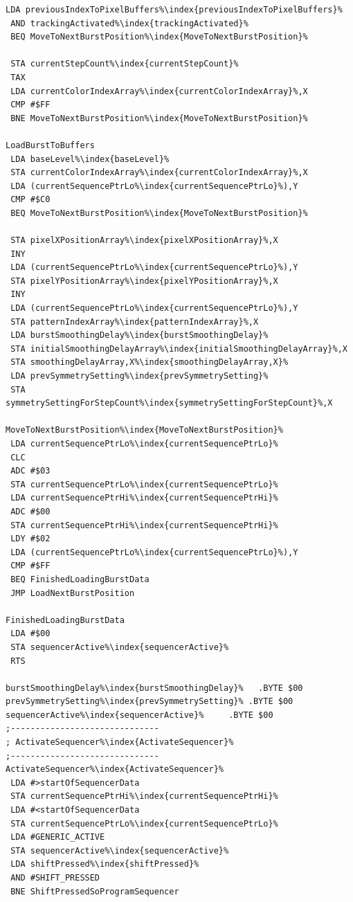 \begin{minipage}[b]{0.33\linewidth}
\begin{lrbox}{\mybox}%
\begin{lstlisting}[basicstyle=\ttfamily\tiny,escapechar=\%]
 LDA previousIndexToPixelBuffers%\index{previousIndexToPixelBuffers}%
 AND trackingActivated%\index{trackingActivated}%
 BEQ MoveToNextBurstPosition%\index{MoveToNextBurstPosition}%

 STA currentStepCount%\index{currentStepCount}%
 TAX
 LDA currentColorIndexArray%\index{currentColorIndexArray}%,X
 CMP #$FF
 BNE MoveToNextBurstPosition%\index{MoveToNextBurstPosition}%

LoadBurstToBuffers
 LDA baseLevel%\index{baseLevel}%
 STA currentColorIndexArray%\index{currentColorIndexArray}%,X
 LDA (currentSequencePtrLo%\index{currentSequencePtrLo}%),Y
 CMP #$C0
 BEQ MoveToNextBurstPosition%\index{MoveToNextBurstPosition}%

 STA pixelXPositionArray%\index{pixelXPositionArray}%,X
 INY
 LDA (currentSequencePtrLo%\index{currentSequencePtrLo}%),Y
 STA pixelYPositionArray%\index{pixelYPositionArray}%,X
 INY
 LDA (currentSequencePtrLo%\index{currentSequencePtrLo}%),Y
 STA patternIndexArray%\index{patternIndexArray}%,X
 LDA burstSmoothingDelay%\index{burstSmoothingDelay}%
 STA initialSmoothingDelayArray%\index{initialSmoothingDelayArray}%,X
 STA smoothingDelayArray,X%\index{smoothingDelayArray,X}%
 LDA prevSymmetrySetting%\index{prevSymmetrySetting}%
 STA symmetrySettingForStepCount%\index{symmetrySettingForStepCount}%,X

MoveToNextBurstPosition%\index{MoveToNextBurstPosition}%
 LDA currentSequencePtrLo%\index{currentSequencePtrLo}%
 CLC
 ADC #$03
 STA currentSequencePtrLo%\index{currentSequencePtrLo}%
 LDA currentSequencePtrHi%\index{currentSequencePtrHi}%
 ADC #$00
 STA currentSequencePtrHi%\index{currentSequencePtrHi}%
 LDY #$02
 LDA (currentSequencePtrLo%\index{currentSequencePtrLo}%),Y
 CMP #$FF
 BEQ FinishedLoadingBurstData
 JMP LoadNextBurstPosition

FinishedLoadingBurstData
 LDA #$00
 STA sequencerActive%\index{sequencerActive}%
 RTS

burstSmoothingDelay%\index{burstSmoothingDelay}%   .BYTE $00
prevSymmetrySetting%\index{prevSymmetrySetting}% .BYTE $00
sequencerActive%\index{sequencerActive}%     .BYTE $00
;------------------------------
; ActivateSequencer%\index{ActivateSequencer}%
;------------------------------
ActivateSequencer%\index{ActivateSequencer}%
 LDA #>startOfSequencerData
 STA currentSequencePtrHi%\index{currentSequencePtrHi}%
 LDA #<startOfSequencerData
 STA currentSequencePtrLo%\index{currentSequencePtrLo}%
 LDA #GENERIC_ACTIVE
 STA sequencerActive%\index{sequencerActive}%
 LDA shiftPressed%\index{shiftPressed}%
 AND #SHIFT_PRESSED
 BNE ShiftPressedSoProgramSequencer


\end{lstlisting}
\end{lrbox}
\end{minipage}
